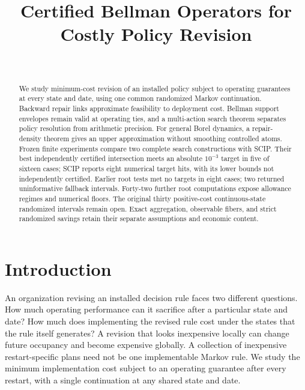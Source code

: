 

\begin{frontmatter}
\title{Certified Bellman Operators for Costly Policy Revision}
\begin{aug}\author[id=au1,addressref={add1}]{~}\address[id=add1]{}\end{aug}
\begin{abstract}
We study minimum-cost revision of an installed policy subject to operating guarantees at every state and date, using one common randomized Markov continuation. Backward repair links approximate feasibility to deployment cost. Bellman support envelopes remain valid at operating ties, and a multi-action search theorem separates policy resolution from arithmetic precision. For general Borel dynamics, a repair-density theorem gives an upper approximation without smoothing controlled atoms. Frozen finite experiments compare two complete search constructions with SCIP. Their best independently certified intersection meets an absolute $10^{-3}$ target in five of sixteen cases; SCIP reports eight numerical target hits, with its lower bounds not independently certified. Earlier root tests met no targets in eight cases; two returned uninformative fallback intervals. Forty-two further root computations expose allowance regimes and numerical floors. The original thirty positive-cost continuous-state randomized intervals remain open. Exact aggregation, observable fibers, and strict randomized savings retain their separate assumptions and economic content.
\end{abstract}
\begin{keyword}\end{keyword}
\end{frontmatter}

\section{Introduction}\label{sec:intro45}
An organization revising an installed decision rule faces two different questions. How much operating performance can it sacrifice after a particular state and date? How much does implementing the revised rule cost under the states that the rule itself generates? A revision that looks inexpensive locally can change future occupancy and become expensive globally. A collection of inexpensive restart-specific plans need not be one implementable Markov rule. We study the minimum implementation cost subject to an operating guarantee after every restart, with a single continuation at any shared state and date.


